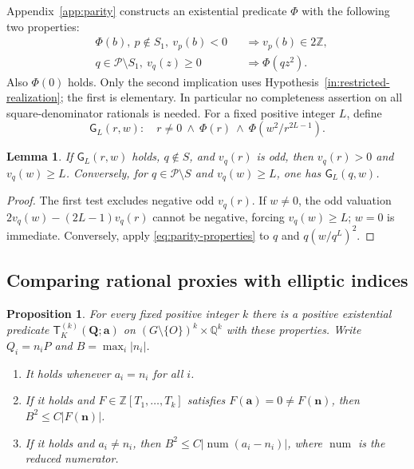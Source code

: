 \documentclass[11pt]{article}
\newtheorem{proposition}[theorem]{Proposition}
\newtheorem{lemma}[theorem]{Lemma}
\theoremstyle{definition}\newtheorem{inputthm}[theorem]{Hypothesis}
\theoremstyle{remark}\newtheorem{remark}[theorem]{Remark}
\newcommand{\Q}{\mathbb Q}\newcommand{\Z}{\mathbb Z}
\begin{document}
Appendix~\ref{app:parity} constructs an existential predicate $\Phi$
with the following two properties:
\begin{equation}\label{eq:parity-properties}
 \begin{aligned}
 &\Phi(b),\ p\notin S_1,\ v_p(b)<0
           &&\Longrightarrow v_p(b)\in2\Z,\\
 &q\in\mathscr P\setminus S_1,\ v_q(z)\ge0
           &&\Longrightarrow\Phi(qz^2).
 \end{aligned}
\end{equation}
Also $\Phi(0)$ holds. Only the second implication uses
Hypothesis~\ref{in:restricted-realization}; the first is elementary.
In particular no completeness assertion on all square-denominator
rationals is needed.
For a fixed positive integer $L$, define
\[
 \mathsf G_L(r,w):\quad r\ne0\ \land\ \Phi(r)
                      \ \land\ \Phi(w^2/r^{2L-1}).
\]
\begin{lemma}\label{dir:G-test}
If $\mathsf G_L(r,w)$ holds, $q\notin S$, and $v_q(r)$ is odd,
then $v_q(r)>0$ and $v_q(w)\ge L$. Conversely, for
$q\in\mathscr P\setminus S$ and $v_q(w)\ge L$, one has
$\mathsf G_L(q,w)$.
\end{lemma}
\begin{proof}
The first test excludes negative odd $v_q(r)$. If $w\ne0$, the odd
valuation $2v_q(w)-(2L-1)v_q(r)$ cannot be negative, forcing
$v_q(w)\ge L$; $w=0$ is immediate. Conversely, apply
\eqref{eq:parity-properties} to $q$ and $q(w/q^L)^2$.
\end{proof}

\subsection{Comparing rational proxies with elliptic indices}

\begin{proposition}\label{prop:certificate}
For every fixed positive integer $k$ there is a positive existential
predicate $\mathsf T_K^{(k)}(\mathbf Q;\mathbf a)$ on
$(G\setminus\{O\})^k\times\Q^k$ with these properties.
Write $Q_i=n_iP$ and $B=\max_i|n_i|$.
\begin{enumerate}[label=\textup{(\roman*)}]
\item It holds whenever $a_i=n_i$ for all $i$.
\item If it holds and $F\in\Z[T_1,\ldots,T_k]$ satisfies
$F(\mathbf a)=0\ne F(\mathbf n)$, then $B^2\le C|F(\mathbf n)|$.
\item If it holds and $a_i\ne n_i$, then
$B^2\le C|\operatorname{num}(a_i-n_i)|$, where
$\operatorname{num}$ is the reduced numerator.
\end{enumerate}
\end{proposition}
\end{document}
